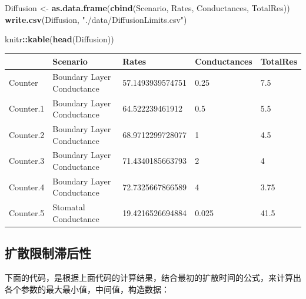 \documentclass[
]{krantz}
\makeatletter
\newenvironment{Shaded}{\begin{snugshade}}{\end{snugshade}}
\newcommand{\KeywordTok}[1]{\textcolor[rgb]{0.13,0.29,0.53}{\textbf{#1}}}
\newcommand{\NormalTok}[1]{#1}
\newcommand{\OperatorTok}[1]{\textcolor[rgb]{0.81,0.36,0.00}{\textbf{#1}}}
\newcommand{\StringTok}[1]{\textcolor[rgb]{0.31,0.60,0.02}{#1}}
\newenvironment{kframe}{%
\medskip{}
\setlength{\fboxsep}{.8em}
 \def\at@end@of@kframe{}%
 \ifinner\ifhmode%
  \def\at@end@of@kframe{\end{minipage}}%
  \begin{minipage}{\columnwidth}%
 \fi\fi%
 \def\FrameCommand##1{\hskip\@totalleftmargin \hskip-\fboxsep
 \colorbox{shadecolor}{##1}\hskip-\fboxsep
     \hskip-\linewidth \hskip-\@totalleftmargin \hskip\columnwidth}%
 \MakeFramed {\advance\hsize-\width
   \@totalleftmargin\z@ \linewidth\hsize
   \@setminipage}}%
 {\par\unskip\endMakeFramed%
 \at@end@of@kframe}
\renewenvironment{Shaded}{\begin{kframe}}{\end{kframe}}
\makeatother
\begin{document}
\begin{Shaded}
\begin{Highlighting}[]
\NormalTok{Diffusion \textless{}{-}}
\StringTok{  }\KeywordTok{as.data.frame}\NormalTok{(}\KeywordTok{cbind}\NormalTok{(Scenario, Rates, Conductances, TotalRes))}
\KeywordTok{write.csv}\NormalTok{(Diffusion, }\StringTok{"./data/DiffusionLimits.csv"}\NormalTok{)}
\end{Highlighting}
\end{Shaded}

\begin{Shaded}
\begin{Highlighting}[]
\NormalTok{knitr}\OperatorTok{::}\KeywordTok{kable}\NormalTok{(}\KeywordTok{head}\NormalTok{(Diffusion))}
\end{Highlighting}
\end{Shaded}

\begin{tabular}{l|l|l|l|l}
\hline
  & Scenario & Rates & Conductances & TotalRes\\
\hline
Counter & Boundary Layer Conductance & 57.1493939574751 & 0.25 & 7.5\\
\hline
Counter.1 & Boundary Layer Conductance & 64.522239461912 & 0.5 & 5.5\\
\hline
Counter.2 & Boundary Layer Conductance & 68.9712299728077 & 1 & 4.5\\
\hline
Counter.3 & Boundary Layer Conductance & 71.4340185663793 & 2 & 4\\
\hline
Counter.4 & Boundary Layer Conductance & 72.7325667866589 & 4 & 3.75\\
\hline
Counter.5 & Stomatal Conductance & 19.4216526694884 & 0.025 & 41.5\\
\hline
\end{tabular}

\hypertarget{multi12}{%
\subsection{扩散限制滞后性}\label{multi12}}

下面的代码，是根据上面代码的计算结果，结合最初的扩散时间的公式，来计算出各个参数的最大最小值，中间值，构造数据：
\end{document}

